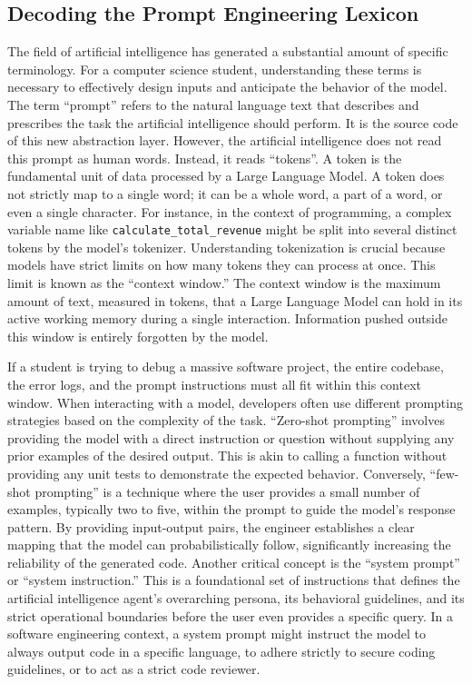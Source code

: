 \documentclass[12pt]{article}
\begin{document}
\subsection{Decoding the Prompt Engineering Lexicon}
The field of artificial intelligence has generated a
substantial amount of specific terminology. For a computer science student, understanding these terms is
necessary to effectively design inputs and anticipate the behavior of the model. The term ``prompt'' refers to the
natural language text that describes and prescribes the task the artificial intelligence should perform.  It
is the source code of this new abstraction layer. However, the artificial intelligence does not read this
prompt as human words. Instead, it reads ``tokens''. A token is the fundamental unit of data processed by a Large
Language Model. A token does not strictly map to a single word; it can be a whole word, a part of a word, or
even a single character. For instance, in the context of programming, a complex variable name like
\texttt{calculate\_total\_revenue} might be split into several distinct tokens by the model's
tokenizer. Understanding tokenization is crucial because models have strict limits on how many tokens they can
process at once. This limit is known as the ``context window.'' The context window is the maximum amount of
text, measured in tokens, that a Large Language Model can hold in its active working memory during a single
interaction. Information pushed outside this window is entirely forgotten by the model.

If a student is trying
to debug a massive software project, the entire codebase, the error logs, and the prompt instructions must all
fit within this context window. When interacting with a model, developers often use different prompting
strategies based on the complexity of the task. ``Zero-shot prompting'' involves providing the model with a
direct instruction or question without supplying any prior examples of the desired output.  This is akin
to calling a function without providing any unit tests to demonstrate the expected behavior. Conversely,
``few-shot prompting'' is a technique where the user provides a small number of examples, typically two to five,
within the prompt to guide the model's response pattern. By providing input-output pairs, the engineer
establishes a clear mapping that the model can probabilistically follow, significantly increasing the
reliability of the generated code. Another critical concept is the ``system prompt'' or ``system instruction.'' This
is a foundational set of instructions that defines the artificial intelligence agent's overarching persona, its
behavioral guidelines, and its strict operational boundaries before the user even provides a specific query. In
a software engineering context, a system prompt might instruct the model to always output code in a specific
language, to adhere strictly to secure coding guidelines, or to act as a strict code reviewer.
\end{document}
